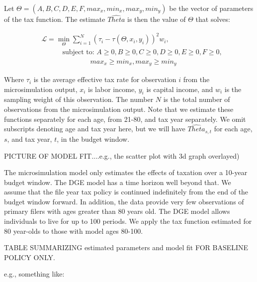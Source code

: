 \documentclass[letterpaper,12pt]{article}
\theoremstyle{definition}
\begin{document}
\begin{spacing}{1.5}
Let $\Theta=(A,B,C,D,E,F,max_x,min_x,max_y,min_y)$ be the vector of parameters of the tax function.  The estimate $\hat{Theta}$ is then the value of $\Theta$ that solves:

\begin{equation}
\begin{split}
&\mathcal{L} = \min_{\Theta} \sum_{i=1}^{N} \left(\tau_{i}-\tau(\Theta,x_{i},y_{i})\right)^{2} w_{i}, \\
&\quad\quad\quad \text{subject to: } A\geq0, B\geq0, C\geq0, D\geq0, E\geq0, F\geq0, \\
&\quad\quad\quad\quad\quad\quad\quad max_{x}\geq min_x, max_{y}\geq min_y   
\end{split}
\end{equation}

Where $\tau_{i}$ is the average effective tax rate for observation $i$ from the microsimulation output, $x_{i}$ is labor income, $y_{i}$ is capital income, and $w_{i}$ is the sampling weight of this observation.  The number $N$ is the total number of observations from the microsimulation output.  Note that we estimate these functions separately for each age, from 21-80, and tax year separately.  We omit subscripts denoting age and tax year here, but we will have $\hat{Theta}_{s,t}$ for each age, $s$, and tax year, $t$, in the budget window.

PICTURE OF MODEL FIT....e.g., the scatter plot with 3d graph overlayed)

The microsimulation model only estimates the effects of taxation over a 10-year budget window. The DGE model has a time horizon well beyond that.  We assume that the file year tax policy is continued indefinitely from the end of the budget window forward.  In addition, the data provide very few observations of primary filers with ages greater than 80 years old.  The DGE model allows individuals to live for up to 100 periods.  We apply the tax function estimated for 80 year-olds to those with model ages 80-100.


TABLE SUMMARIZING estimated parameters and model fit FOR BASELINE POLICY ONLY.





e.g., something like:


\end{spacing}
\end{document}
